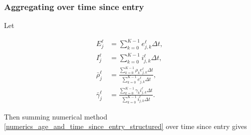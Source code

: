 \documentclass{jpmarticle}
\let\subequationsorig\subequations%
\let\endsubequationsorig\endsubequations%
\renewenvironment{subequations}{
  \subequationsorig
  \renewcommand{\theequation}{\theparentequation.\arabic{equation}}
}{
  \endsubequationsorig
}
\begin{document}
\subsubsection{Aggregating over time since entry}

Let
\begin{subequations}
  \begin{align}
    E_j^{\ell}
    &= \sum_{k = 0}^{K - 1} e_{j, k}^{\ell} \Delta t,
    \\
    I_j^{\ell}
    &= \sum_{k = 0}^{K - 1} i_{j, k}^{\ell} \Delta t,
    \\
    \bar{\rho}_j^{\ell}
    &= \frac{\sum_{k = 0}^{K - 1} \rho_k e_{j, k}^{\ell} \Delta t}
      {\sum_{k = 0}^{K - 1} e_{j, k}^{\ell} \Delta t},
    \\
    \bar{\gamma}_j^{\ell}
    &= \frac{\sum_{k = 0}^{K - 1} \gamma_k i_{j, k}^{\ell} \Delta t}
      {\sum_{k = 0}^{K - 1} i_{j, k}^{\ell} \Delta t}.
  \end{align}
\end{subequations}
Then summing numerical method
\eqref{numerics_age_and_time_since_entry_structured} over time since
entry gives
\end{document}
